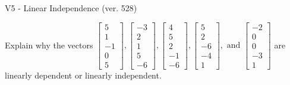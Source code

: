 \begin{exercise}
  \begin{exerciseTitle}V5 - Linear Independence (ver. 528)\end{exerciseTitle}
  \begin{exerciseStatement}
    Explain why the vectors \(\left[\begin{array}{r}
5 \\
1 \\
-1 \\
0 \\
5
\end{array}\right] , \left[\begin{array}{r}
-3 \\
2 \\
1 \\
5 \\
-6
\end{array}\right] , \left[\begin{array}{r}
4 \\
5 \\
2 \\
-1 \\
-6
\end{array}\right] , \left[\begin{array}{r}
5 \\
2 \\
-6 \\
-4 \\
1
\end{array}\right] , \text{ and } \left[\begin{array}{r}
-2 \\
0 \\
0 \\
-3 \\
1
\end{array}\right]\) are linearly dependent or linearly independent.	



\end{exerciseStatement}
\end{exercise}

